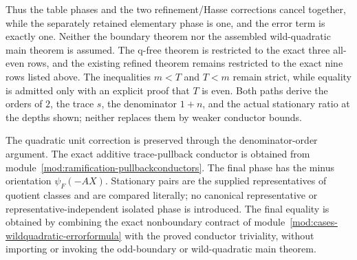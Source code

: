 \begin{theorem}
Thus the table phases and the two refinement/Hasse corrections cancel
together, while the separately retained elementary phase is one, and the
error term is exactly one.  Neither the boundary theorem nor the assembled
wild-quadratic main theorem is assumed.
\leanok
{}
\FormalizationContract
The q-free theorem is restricted to the exact three all-even rows, and the
existing refined theorem remains restricted to the exact nine rows listed
above.  The inequalities \(m<T\) and \(T<m\) remain strict, while equality
is admitted only with an explicit proof that \(T\) is even.  Both paths
derive the orders of \(2\), the trace \(s\), the denominator \(1+n\), and
the actual stationary ratio at the depths shown; neither replaces them by
weaker conductor bounds.

The quadratic unit correction is preserved through the denominator-order
argument.  The exact additive trace-pullback conductor is obtained from
module~\ref{mod:ramification-pullbackconductors}.  The final phase has the
minus orientation \(\psi_F(-AX)\).  Stationary pairs are the supplied
representatives of quotient classes and are compared literally; no
canonical representative or representative-independent isolated phase is
introduced.  The final equality is obtained by combining the exact
nonboundary contract of module~\ref{mod:cases-wildquadratic-errorformula}
with the proved conductor triviality, without importing or invoking the
odd-boundary or wild-quadratic main theorem.
\end{theorem}

